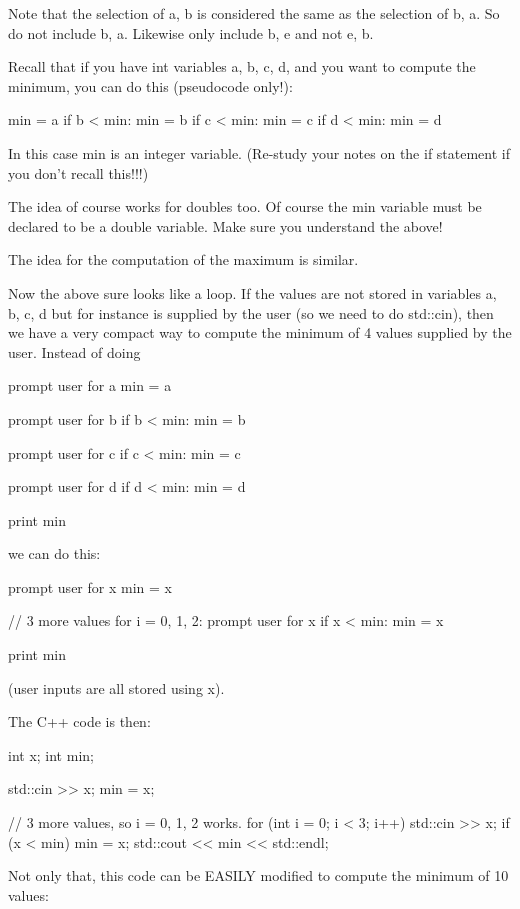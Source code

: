 Note that the selection of a, b is considered the same as the selection of b, a. So do not include b, a. Likewise only include b, e and not e, b.

\newpage{}

Recall that if you have int variables a, b, c, d, and you want to
compute the minimum, you can do this (pseudocode only!):
\begin{console}
min = a
if b < min:
   min = b
if c < min:
   min = c
if d < min:
   min = d
\end{console}
In this case min is an integer variable. (Re-study your notes on the if
statement if you don't recall this!!!)

The idea of course works for doubles too. Of course the min variable
must be declared to be a double variable. Make sure you understand the
above!

The idea for the computation of the maximum is similar.

Now the above sure looks like a loop. If the values are not stored in
variables a, b, c, d but for instance is supplied by the user (so we
need to do std::cin), then we have a very compact way to compute the
minimum of 4 values supplied by the user. Instead of doing
\begin{console}
prompt user for a
min = a

prompt user for b
if b < min:
   min = b

prompt user for c
if c < min:
   min = c

prompt user for d
if d < min:
   min = d

print min
\end{console}
we can do this:

\begin{console}
prompt user for x
min = x

// 3 more values
for i = 0, 1, 2:
    prompt user for x
    if x < min:
       min = x
       
print min
\end{console}

(user inputs are all stored using x).

The C++ code is then:

\begin{console}
int x;
int min;

std::cin >> x;
min = x;

// 3 more values, so i = 0, 1, 2 works.
for (int i = 0; i < 3; i++)
{   
    std::cin >> x;
    if (x < min)
    {
        min = x;
    }
}
std::cout << min << std::endl; 
\end{console}
Not only that, this code can be EASILY modified to compute the minimum
of 10 values:

